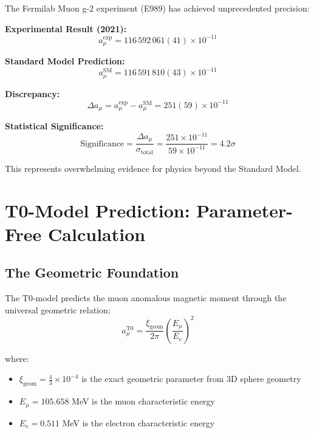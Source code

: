 \documentclass[12pt,a4paper]{report}
\newcommand{\xigeom}{\xi_{\text{geom}}}   %
\newcommand{\Ee}{E_e}                     %
\newcommand{\Emu}{E_\mu}                  %
\begin{document}
The Fermilab Muon g-2 experiment (E989) has achieved unprecedented precision:

\textbf{Experimental Result (2021):}
\begin{equation}
	a_\mu^{\text{exp}} = 116\,592\,061(41) \times 10^{-11}
	\label{eq:experimental_value}
\end{equation}

\textbf{Standard Model Prediction:}
\begin{equation}
	a_\mu^{\text{SM}} = 116\,591\,810(43) \times 10^{-11}
	\label{eq:sm_prediction}
\end{equation}

\textbf{Discrepancy:}
\begin{equation}
	\Delta a_\mu = a_\mu^{\text{exp}} - a_\mu^{\text{SM}} = 251(59) \times 10^{-11}
	\label{eq:discrepancy}
\end{equation}

\textbf{Statistical Significance:}
\begin{equation}
	\text{Significance} = \frac{\Delta a_\mu}{\sigma_{\text{total}}} = \frac{251 \times 10^{-11}}{59 \times 10^{-11}} = 4.2\sigma
	\label{eq:significance}
\end{equation}

This represents overwhelming evidence for physics beyond the Standard Model.

\section{T0-Model Prediction: Parameter-Free Calculation}
\label{sec:t0_prediction}

\subsection{The Geometric Foundation}
\label{subsec:geometric_foundation}

The T0-model predicts the muon anomalous magnetic moment through the universal geometric relation:
\begin{equation}
	a_\mu^{\text{T0}} = \frac{\xigeom}{2\pi} \left(\frac{\Emu}{\Ee}\right)^2
	\label{eq:t0_prediction}
\end{equation}

where:
\begin{itemize}
	\item $\xigeom = \frac{4}{3} \times 10^{-4}$ is the exact geometric parameter from 3D sphere geometry
	\item $\Emu = 105.658$ MeV is the muon characteristic energy
	\item $\Ee = 0.511$ MeV is the electron characteristic energy
\end{itemize}
\end{document}
